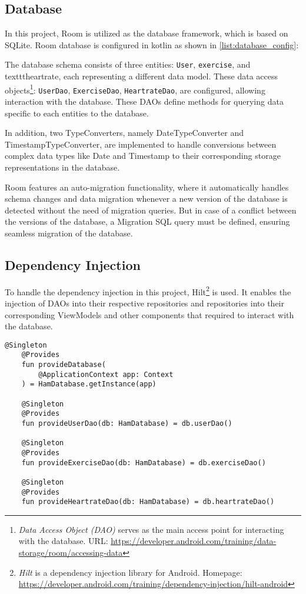 \subsection{Database}
In this project, Room is utilized as the database framework, which is based on SQLite. Room database is configured in kotlin as shown in \autoref{list:database_config}:

The database schema consists of three entities: \texttt{User}, \texttt{exercise}, and texttt{heartrate}, each representing a different data model.
These data access objects\footnote{\emph{Data Access Object (DAO)} serves as the main access point for interacting with the database. URL: \url{https://developer.android.com/training/data-storage/room/accessing-data}}: \texttt{UserDao}, \texttt{ExerciseDao}, \texttt{HeartrateDao}, are configured, allowing interaction with the database. These DAOs define methods for querying data specific to each entities to the database.

In addition, two TypeConverters, namely DateTypeConverter and TimestampTypeConverter, are implemented to handle conversions between complex data types like Date and Timestamp to their corresponding storage representations in the database.

Room features an auto-migration functionality, where it automatically handles schema changes and data migration whenever a new version of the database is detected without the need of migration queries.
But in case of a conflict between the versions of the database, a Migration SQL query must be defined, ensuring seamless migration of the database.

\subsection{Dependency Injection}
To handle the dependency injection in this project, Hilt\footnote{\emph{Hilt} is a dependency injection library for Android. Homepage: \url{https://developer.android.com/training/dependency-injection/hilt-android}} is used. 
It enables the injection of DAOs into their respective repositories and repositories into their corresponding ViewModels and other components that required to interact with the database. 
\begin{lstlisting}[caption={Dependency injection configuration (AppModule)}]
    @Singleton
    @Provides
    fun provideDatabase(
        @ApplicationContext app: Context
    ) = HamDatabase.getInstance(app)

    @Singleton
    @Provides
    fun provideUserDao(db: HamDatabase) = db.userDao()

    @Singleton
    @Provides
    fun provideExerciseDao(db: HamDatabase) = db.exerciseDao()

    @Singleton
    @Provides
    fun provideHeartrateDao(db: HamDatabase) = db.heartrateDao()
\end{lstlisting}
